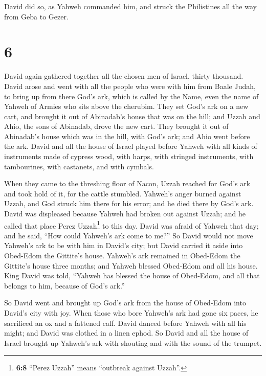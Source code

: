  David did so, as Yahweh commanded him, and struck the
Philistines all the way from Geba to Gezer.

\hypertarget{section-5}{%
\section{6}\label{section-5}}

 David again gathered together all the chosen men of
Israel, thirty thousand.  David arose and went with all
the people who were with him from Baale Judah, to bring up from there
God's ark, which is called by the Name, even the name of Yahweh of
Armies who sits above the cherubim.  They set God's ark on
a new cart, and brought it out of Abinadab's house that was on the hill;
and Uzzah and Ahio, the sons of Abinadab, drove the new cart.
 They brought it out of Abinadab's house which was in the
hill, with God's ark; and Ahio went before the ark.  David
and all the house of Israel played before Yahweh with all kinds of
instruments made of cypress wood, with harps, with stringed instruments,
with tambourines, with castanets, and with cymbals.

 When they came to the threshing floor of Nacon, Uzzah
reached for God's ark and took hold of it, for the cattle stumbled.
 Yahweh's anger burned against Uzzah, and God struck him
there for his error; and he died there by God's ark. 
David was displeased because Yahweh had broken out against Uzzah; and he
called that place Perez Uzzah\footnote{\textbf{6:8} ``Perez Uzzah''
  means ``outbreak against Uzzah''.} to this day.  David
was afraid of Yahweh that day; and he said, ``How could Yahweh's ark
come to me?''  So David would not move Yahweh's ark to be
with him in David's city; but David carried it aside into Obed-Edom the
Gittite's house.  Yahweh's ark remained in Obed-Edom the
Gittite's house three months; and Yahweh blessed Obed-Edom and all his
house.  King David was told, ``Yahweh has blessed the
house of Obed-Edom, and all that belongs to him, because of God's ark.''

So David went and brought up God's ark from the house of Obed-Edom into
David's city with joy.  When those who bore Yahweh's ark
had gone six paces, he sacrificed an ox and a fattened calf.
 David danced before Yahweh with all his might; and David
was clothed in a linen ephod.  So David and all the house
of Israel brought up Yahweh's ark with shouting and with the sound of
the trumpet.

